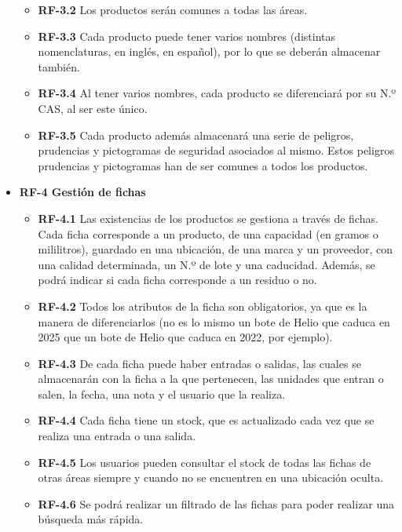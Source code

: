 \begin{itemize}
\begin{itemize}
	\item\textbf{ RF-3.2} Los productos serán comunes a todas las áreas.
	
	\item\textbf{ RF-3.3} Cada producto puede tener varios nombres (distintas nomenclaturas, en inglés, en español), por lo que se deberán almacenar también.
	
	\item\textbf{ RF-3.4} Al tener varios nombres, cada producto se diferenciará por su N.º CAS, al ser este único.
	
	\item\textbf{ RF-3.5} Cada producto además almacenará una serie de peligros, prudencias y pictogramas de seguridad asociados al mismo. Estos peligros prudencias y pictogramas han de ser comunes a todos los productos.
	
	\end{itemize}
	
\item \textbf{RF-4 Gestión de fichas}
	\begin{itemize}
	\item\textbf{ RF-4.1} Las existencias de los productos se gestiona a través de fichas. Cada ficha corresponde a un producto, de una capacidad (en gramos o mililitros), guardado en una 	ubicación, de una marca y un proveedor, con una calidad determinada, un N.º de lote y una caducidad. Además, se podrá indicar si cada ficha corresponde a un residuo o no. 
	
	\item\textbf{ RF-4.2} Todos los atributos de la ficha son obligatorios, ya que es la manera de diferenciarlos (no es lo mismo un bote de Helio que caduca en 2025 que un bote de Helio que caduca en 2022, por ejemplo).

	\item\textbf{ RF-4.3} De cada ficha puede haber entradas o salidas, las cuales se almacenarán con la ficha a la que pertenecen, las unidades que entran o salen, la fecha, una nota y el usuario que la realiza.
	
	\item\textbf{ RF-4.4} Cada ficha tiene un stock, que es actualizado cada vez que se realiza una entrada o una salida.
	
	\item\textbf{ RF-4.5} Los usuarios pueden consultar el stock de todas las fichas de otras áreas siempre y cuando no se encuentren en una ubicación oculta.
	
	\item\textbf{ RF-4.6} Se podrá realizar un filtrado de las fichas para poder realizar una búsqueda más rápida.
	

\end{itemize}
\end{itemize}

